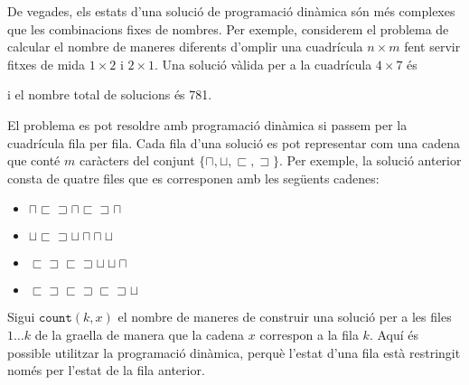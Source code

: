 De vegades, els estats d'una solució de programació dinàmica
són més complexes que les combinacions fixes de nombres.
Per exemple,
considerem el problema de calcular
el nombre de maneres diferents d'omplir
una cuadrícula $n \times m$ fent servir
fitxes de mida $1 \times 2$ i $2 \times 1$.
Una solució vàlida per a la cuadrícula $4 \times 7$ és
\begin{center}
\end{center}
i el nombre total de solucions és 781.

El problema es pot resoldre amb programació dinàmica
si passem per la cuadrícula fila per fila.
Cada fila d'una solució es pot representar com una
cadena que conté $m$ caràcters del conjunt
$\{\sqcap, \sqcup, \sqsubset, \sqsupset \}$.
Per exemple, la solució anterior consta de quatre files
que es corresponen amb les següents cadenes:
\begin{itemize}
\item
$\sqcap \sqsubset \sqsupset \sqcap \sqsubset \sqsupset \sqcap$
\item
$\sqcup \sqsubset \sqsupset \sqcup \sqcap \sqcap \sqcup$
\item
$\sqsubset \sqsupset \sqsubset \sqsupset \sqcup \sqcup \sqcap$
\item
$\sqsubset \sqsupset \sqsubset \sqsupset \sqsubset \sqsupset \sqcup$
\end{itemize}

Sigui $\texttt{count}(k,x)$ el nombre de maneres de construir
una solució per a les files $1 \ldots k$
de la graella de manera que la cadena $x$ correspon a la fila $k$.
Aquí és possible utilitzar la programació dinàmica,
perquè l'estat d'una fila està restringit
només per l'estat de la fila anterior.


